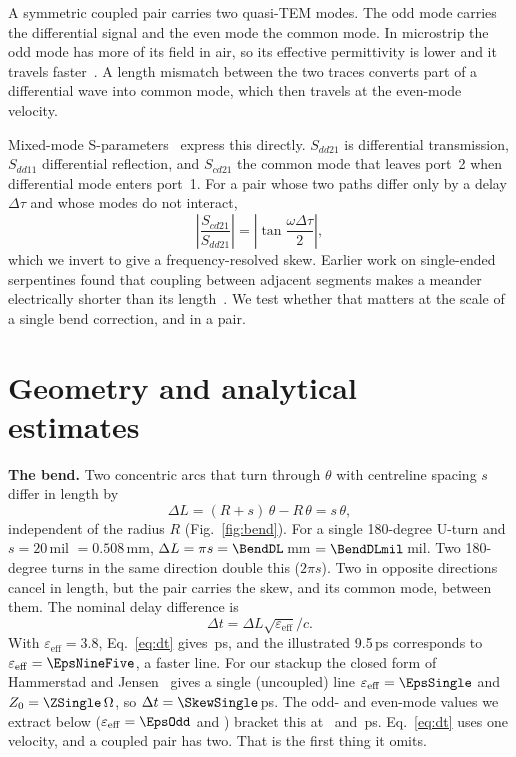 \documentclass[10pt,twocolumn]{article}
\newcommand{\Sdd}[1]{S_{dd#1}}
\newcommand{\Scd}[1]{S_{cd#1}}
\newcommand{\eeff}{\varepsilon_{\mathrm{eff}}}
\begin{document}
A symmetric coupled pair carries two quasi-TEM modes. The odd mode carries the differential signal and the even mode
the common mode. In microstrip the odd mode has more of its field in air, so its effective permittivity is
lower and it travels faster~\cite{paul_mtl}. A length mismatch between the two traces converts part of a
differential wave into common mode, which then travels at the even-mode velocity.

Mixed-mode S-parameters~\cite{bockelman1995,ferrero2006} express this directly. $\Sdd{21}$ is differential
transmission, $\Sdd{11}$ differential reflection, and $\Scd{21}$ the common mode that leaves port~2 when
differential mode enters port~1. For a pair whose two paths differ only by a delay $\Delta\tau$ and whose modes do
not interact,
\begin{equation}
  \left|\frac{\Scd{21}}{\Sdd{21}}\right| = \left|\tan\frac{\omega\Delta\tau}{2}\right|,
  \label{eq:fdskew}
\end{equation}
which we invert to give a frequency-resolved skew. Earlier work on single-ended serpentines found that coupling
between adjacent segments makes a meander electrically shorter than its length~\cite{wu1995,rubin2000}. We test
whether that matters at the scale of a single bend correction, and in a pair.

\section[Geometry and analytical estimates]{Geometry and analytical\protect\\ estimates}
\label{sec:geometry}

\textbf{The bend.} Two concentric arcs that turn through $\theta$ with centreline spacing $s$ differ in length by
\begin{equation}
  \Delta L = (R + s)\,\theta - R\,\theta = s\,\theta ,
  \label{eq:dl}
\end{equation}
independent of the radius $R$ (Fig.~\ref{fig:bend}). For a single 180-degree U-turn and $s = 20$\,mil
$= 0.508$\,mm, $\Delta L = \pi s = \BendDL$\,mm $= \BendDLmil$\,mil. Two 180-degree turns in the same direction
double this ($2\pi s$). Two in opposite directions cancel in length, but the pair carries the skew, and its common
mode, between them. The nominal delay difference is
\begin{equation}
  \Delta t = \Delta L \sqrt{\eeff}/c .
  \label{eq:dt}
\end{equation}
With $\eeff = 3.8$, Eq.~\eqref{eq:dt} gives \SkewEpsThreeEight\,ps, and the illustrated 9.5\,ps corresponds to
$\eeff = \EpsNineFive$, a faster line. For our stackup the closed form of Hammerstad and
Jensen~\cite{hammerstad1980} gives a single (uncoupled) line $\eeff = \EpsSingle$ and $Z_0 = \ZSingle\,\Omega$, so
$\Delta t = \SkewSingle$\,ps. The odd- and even-mode values we extract below
($\eeff = \EpsOdd$ and \EpsEven) bracket this at \SkewOdd\ and \SkewEven\,ps. Eq.~\eqref{eq:dt} uses one
velocity, and a coupled pair has two. That is the first thing it omits.
\end{document}
